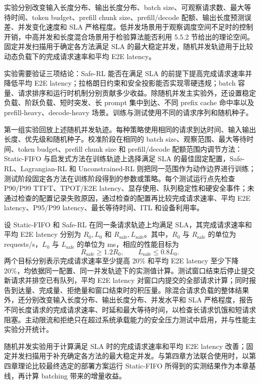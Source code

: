 实验分别改变输入长度分布、输出长度分布、batch size、可观察请求数、最大等待时间、token budget、prefill chunk size、prefill/decode 配额、输出长度预测误差、并发变化速度和 SLA 严格程度。低并发场景用于观察调度空间不足时的控制开销，中高并发和长度混合场景用于检验算法能否利用 5.5.2 节给出的理论空间。固定并发扫描用于确定各方法满足 SLA 的最大稳定并发，随机并发轨迹用于比较动态负载下的完成请求速率和平均 E2E latency。

实验需要验证三项结论：Safe-RL 能否在满足 SLA 的前提下提高完成请求速率并降低平均 E2E latency；拉格朗日约束和安全投影能否实现零硬违规；batch 容量、请求排序和运行时机制分别贡献多少收益。除随机并发主实验外，还设置稳定负载、阶跃负载、短时突发、长 prompt 集中到达、不同 prefix cache 命中率以及 prefill-heavy、decode-heavy 场景。训练与测试使用不同的请求序列和随机种子。

第一组实验回放上述随机并发轨迹。每种策略使用相同的请求到达时间、输入输出长度、优先级和随机种子。校准阶段在相同的 batch size、观察范围、最大等待时间、token budget、prefill chunk size 和 prefill/decode 配额范围内调节方法：Static-FIFO 与启发式方法在训练轨迹上选择满足 SLA 的最佳固定配置，Safe-RL、Lagrangian-RL 和 Unconstrained-RL 则把同一范围作为动作边界进行训练；测试阶段固定各方法在训练阶段得到的参数或策略。每个测试运行点先检查 P90/P99 TTFT、TPOT/E2E latency、显存使用、队列稳定性和硬安全事件；未通过检查的配置记录失败原因，通过检查的配置再比较完成请求速率、平均 E2E latency、P95/P99 latency、最长等待时间、ITL 和设备利用率。

设 Static-FIFO 和 Safe-RL 在同一条请求轨迹上均满足 SLA，其完成请求速率和平均 E2E latency 分别为 \(R_0,L_0\) 和 \(R_{\mathrm{safe}},L_{\mathrm{safe}}\)。其中，\(R_0\) 与 \(R_{\mathrm{safe}}\) 的单位为 requests/s，\(L_0\) 与 \(L_{\mathrm{safe}}\) 的单位为 ms，相应的性能目标为
\[
R_{\mathrm{safe}}\geq1.2R_0,
\qquad
L_{\mathrm{safe}}\leq0.8L_0.
\]
两个目标分别表示完成请求速率至少提高 20\% 和平均 E2E latency 至少下降 20\%，均依据同一配置、同一并发轨迹下的实测值计算。测试窗口结束后停止提交新请求并排空已有队列，平均 E2E latency 对窗口内提交的全部请求计算；同时报告到达量、完成量、拒绝量和窗口结束时的积压量。除混合请求负载的整体结果外，还分别改变输入长度分布、输出长度分布、并发水平和 SLA 严格程度，报告不同长度请求的完成请求速率、时延和最大等待时间，以检查长请求饥饿和短请求阻塞。主动限流和拒绝只在超过系统承载能力的安全压力测试中启用，并与性能主实验分开统计。

随机并发实验用于计算满足 SLA 时的完成请求速率和平均 E2E latency 改善；固定并发扫描用于补充确定各方法的最大稳定并发。与第四章方法联合使用时，以第四章理论比较最终选定的部署方案运行 Static-FIFO 所得到的实测结果作为本章基线，再计算 batching 带来的增量收益。

